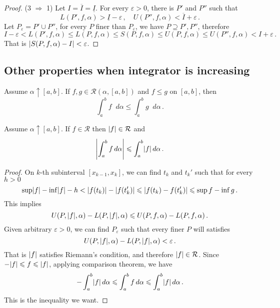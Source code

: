 \documentclass{article}
\newcommand{\upI}{\overline{I}}
\newcommand{\lowI}{\underline{I}}
\newcommand{\Riemann}{\mathcal R}
\DeclarePairedDelimiter\abs{\lvert}{\rvert}
\newcommand{\finer}{\supseteq}
\newcommand{\dd}{\mathop{}\!d}
\newcommand{\increasing}{\uparrow}
\begin{document}
\begin{proof}
    (3 $ \Rightarrow $ 1) Let $ I = \upI = \lowI $. For every $ \varepsilon > 0 $, there is $ P' $ and $ P'' $ such that
    \[ 
        L(P', f, \alpha) > \lowI - \varepsilon \,, \quad U(P'', f, \alpha) < \upI + \varepsilon \,.
    \]
    Let $ P_\varepsilon = P' \cup P'' $, for every $ P $ finer than $ P_\varepsilon $, we have $ P \finer P', P'' $, therefore
    \[ 
        I - \varepsilon < L(P', f, \alpha) \leqslant L(P, f, \alpha) \leqslant S(P, f, \alpha) \leqslant U(P, f, \alpha) \leqslant U(P'', f, \alpha) < I + \varepsilon \,.
    \]
    That is $ \abs{ S(P, f, \alpha) - I } < \varepsilon $.
\end{proof}

\subsection{Other properties when integrator is increasing}
\begin{theorem}
    Assume $ \alpha \increasing [a, b] $. If $ f, g \in \Riemann(\alpha, [a, b]) $ and $ f \leqslant g $ on $ [a, b] $, then
    \[ 
        \int_a^b f \dd \alpha \leqslant \int_a^b g \dd \alpha \,.    
    \]
\end{theorem}

\begin{theorem}
    Assume $ \alpha \increasing [a, b] $. If $ f \in \Riemann $ then $ \abs{ f } \in \Riemann $ and
    \[ 
        \abs*{ \int_a^b f \dd \alpha } \leqslant \int_a^b \abs{ f } \dd \alpha \,.
    \]
\end{theorem}

\begin{proof}
    On  $ k $-th subinterval $ [x_{k-1}, x_k] $, we can find $ t_k $ and $ t_k' $ such that for every $ h > 0 $
    \[ 
        \sup \abs{ f } - \inf \abs{ f } - h < \abs{ f(t_k) } - \abs{ f(t_k') } \leqslant \abs{ f(t_k) - f(t_k') } \leqslant \sup f - \inf g \,.
    \]
    This implies
    \[ 
        U(P, \abs{ f }, \alpha) - L(P, \abs{ f }, \alpha) \leqslant U(P, f, \alpha) - L(P, f, \alpha) \,.
    \]
    Given arbitrary $ \varepsilon > 0 $, we can find $ P_\varepsilon $ such that every finer $ P $ will satisfies
    \[ 
        U(P, \abs{ f }, \alpha) - L(P, \abs{ f }, \alpha) < \varepsilon \,.
    \]
    That is $ \abs{ f } $ satisfies Riemann's condition, and therefore $ \abs{ f } \in \Riemann $. Since $ -\abs{ f } \leqslant f \leqslant \abs{ f } $, applying comparison theorem, we have
    \[ 
        - \int_a^b \abs{ f } \dd \alpha \leqslant \int_a^b f \dd \alpha \leqslant \int_a^b \abs{ f } \dd \alpha \,.
    \]
    This is the inequality we want.
\end{proof}
\end{document}
